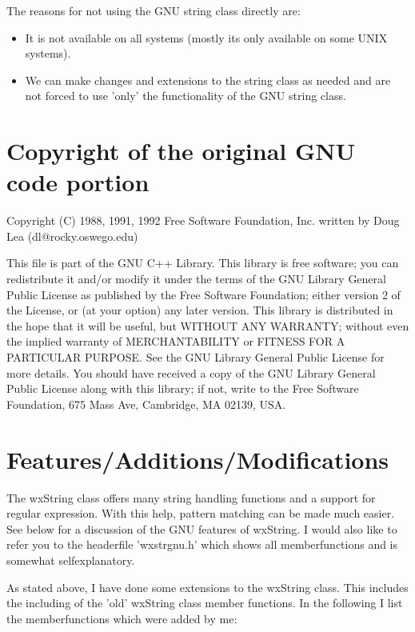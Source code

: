 The reasons for not using the GNU string class directly are:
\begin{itemize}
\item It is not available on all systems (mostly its only available on some 
UNIX systems).
\item We can make changes and extensions to the string class as needed and are not
forced to use 'only' the functionality of the GNU string class.
\end{itemize}

\section{Copyright of the original GNU code portion}
%
\setfooter{\thepage}{}{}{}{}{\thepage}

Copyright (C) 1988, 1991, 1992 Free Software Foundation, Inc.
written by Doug Lea (dl@rocky.oswego.edu)

This file is part of the GNU C++ Library. This library is free
software; you can redistribute it and/or modify it under the terms of
the GNU Library General Public License as published by the Free
Software Foundation; either version 2 of the License, or (at your
option) any later version. This library is distributed in the hope
that it will be useful, but WITHOUT ANY WARRANTY; without even the
implied warranty of MERCHANTABILITY or FITNESS FOR A PARTICULAR
PURPOSE. See the GNU Library General Public License for more details.
You should have received a copy of the GNU Library General Public
License along with this library; if not, write to the Free Software
Foundation, 675 Mass Ave, Cambridge, MA 02139, USA.

\section{Features/Additions/Modifications}
%
\setfooter{\thepage}{}{}{}{}{\thepage}

The wxString class offers many string handling functions and a support for
regular expression. With this help, pattern matching can be made much
easier.
See below for a discussion of the GNU features of wxString. I would also
like to refer you to the headerfile 'wxstrgnu.h' which shows all memberfunctions
and is somewhat selfexplanatory.

As stated above, I have done some extensions to the wxString class.
This includes the including of the 'old' wxString class member functions.
In the following I list the memberfunctions which were added by me:

